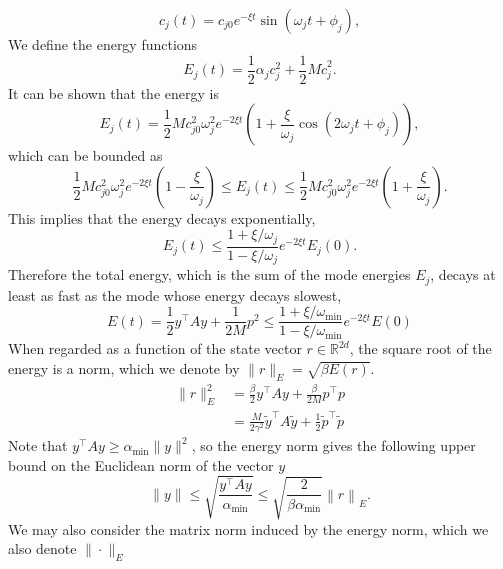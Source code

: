 \documentclass[prx,onecolumn,floatfix,longbibliography,notitlepage, nofootinbib,12pt]{revtex4-2}
\renewcommand{\geq}{\geqslant}
\renewcommand{\leq}{\leqslant}
\begin{document}
\begin{appendix}
\begin{equation}
    c_j(t) = c_{j0}e^{-\xi t}\sin(\omega_j t + \phi_j),
\end{equation}
We define the energy functions
\begin{equation}
    E_j(t) = \frac{1}{2} \alpha_j c_j^2 + \frac{1}{2} M \dot{c}_j^2.
\end{equation}
It can be shown that the energy is
\begin{equation}
    E_j(t) =  \frac{1}{2} M c_{j0}^2\omega_j^2e^{-2 \xi t} \left(1 + \frac{\xi  }{\omega_j}\cos(2 \omega_j t + \phi_j) \right),
\end{equation}
which can be bounded as
\begin{equation}
   \frac{1}{2} M c_{j0}^2\omega_j^2e^{-2 \xi t} \left(1 - \frac{\xi  }{\omega_j} \right) \leq  E_j(t) \leq  \frac{1}{2} M c_{j0}^2\omega_j^2e^{-2 \xi t} \left(1 + \frac{\xi  }{\omega_j} \right).
\end{equation}
This implies that the energy decays exponentially,
\begin{equation}
    E_j(t) \leq \frac{1+\xi/\omega_j}{1-\xi/\omega_j}e^{-2 \xi t} E_j(0).
\end{equation}
Therefore the total energy, which is the sum of the mode energies $E_j$, decays at least as fast as the mode whose energy decays slowest,
\begin{equation}
    E(t) = \frac{1}{2} y^\intercal A y +\frac{1}{2M} p^2 \leq  \frac{1+\xi/\omega_\text{min}}{1-\xi/\omega_\text{min}}e^{-2 \xi t} E(0)
\end{equation}
When regarded as a function of the state vector $r\in \mathbb{R}^{2d}$, the square root of the energy is a norm, which we denote by $\|r\|_E = \sqrt{\beta E(r)}$.
\begin{align}
    \|r\|_E^2 &= \frac{\beta}{2}y^\intercal A y + \frac{\beta}{2M}p^\intercal p\\
    &= \frac{M}{2\gamma^2}\tilde{y}^\intercal A \tilde{y} + \frac{1}{2 } \tilde{p}^\intercal \tilde{p}
\end{align}
Note that $y^\intercal A y \geq \alpha_\text{min} \|y\|^2$, so the energy norm gives the following upper bound on the Euclidean norm of the vector $y$
\begin{equation}
    \|y\| \leq  \sqrt{\frac{y^\intercal A y}{\alpha_\text{min}}} \leq \sqrt{\frac{2}{\beta \alpha_\text{min}}} \left \|r \right\|_E.
\end{equation}
We may also consider the matrix norm induced by the energy norm, which we also denote $\| \cdot\|_E$

\end{appendix}
\end{document}
